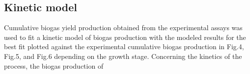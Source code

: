 \subsection{Kinetic model}
Cumulative biogas yield production obtained from the experimental assays was used to fit a kinetic model of biogas production with the modeled results for the best fit plotted against the experimental cumulative biogas production in Fig.4, Fig.5, and Fig.6 depending on the growth stage.
Concerning the kinetics of the process, the biogas production of 